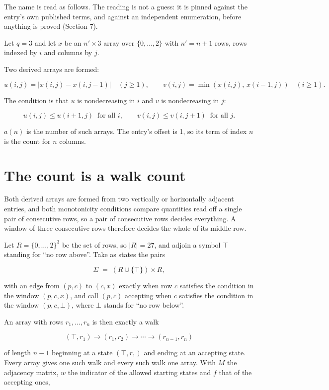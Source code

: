 \documentclass[11pt]{article}
\theoremstyle{definition}
\begin{document}
The name is read as follows. The reading is not a guess: it is pinned against the entry's own published terms, and against an independent enumeration, before anything is proved (Section 7).

Let $q = 3$ and let $x$ be an $n' \times 3$ array over $\{0,\dots,2\}$ with $n' = n + 1$ rows, rows indexed by $i$ and columns by $j$.

Two derived arrays are formed:

\[u(i,j) = \lvert x(i,j) - x(i,j{-}1)\rvert\quad (j \ge 1), \qquad v(i,j) = \min(x(i,j),\,x(i{-}1,j))\quad (i \ge 1).\]

The condition is that $u$ is nondecreasing in $i$ and $v$ is nondecreasing in $j$:

\[u(i,j) \le u(i{+}1,j) \ \text{ for all } i, \qquad v(i,j) \le v(i,j{+}1) \ \text{ for all } j.\]

$a(n)$ is the number of such arrays. The entry's offset is 1, so its term of index $n$ is the count for $n$ columns.

\section{The count is a walk count}

Both derived arrays are formed from two vertically or horizontally adjacent entries, and both monotonicity conditions compare quantities read off a single pair of consecutive rows, so a pair of consecutive rows decides everything. A window of three consecutive rows therefore decides the whole of its middle row.

Let $R = \{0,\dots,2\}^{3}$ be the set of rows, so $|R| = 27$, and adjoin a symbol $\top$ standing for ``no row above''. Take as states the pairs

\[\Sigma \;=\; (R \cup \{\top\}) \times R,\]

with an edge from $(p,c)$ to $(c,x)$ exactly when row $c$ satisfies the condition in the window $(p,c,x)$, and call $(p,c)$ accepting when $c$ satisfies the condition in the window $(p,c,\bot)$, where $\bot$ stands for ``no row below''.

An array with rows $r_1,\dots,r_n$ is then exactly a walk

\[(\top,r_1) \to (r_1,r_2) \to \cdots \to (r_{n-1},r_n)\]

of length $n-1$ beginning at a state $(\top,r_1)$ and ending at an accepting state. Every array gives one such walk and every such walk one array. With $M$ the adjacency matrix, $w$ the indicator of the allowed starting states and $f$ that of the accepting ones,
\end{document}
